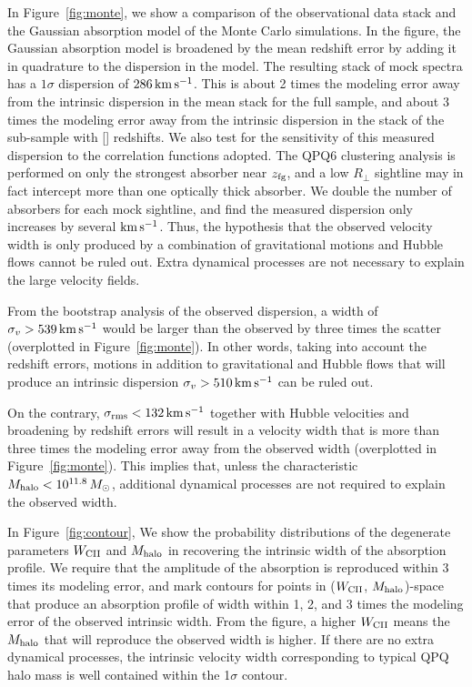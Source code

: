 \documentclass[iop]{emulateapj}
\begin{document}
In Figure~\ref{fig:monte}, we show a comparison of the observational data stack and the Gaussian 
absorption model of the Monte Carlo simulations. In the figure, the Gaussian absorption model is 
broadened by the mean redshift error by adding it in quadrature to the dispersion in the model. 
The resulting stack of mock spectra has a $1\sigma$ dispersion of $286\,{\rm km\,s^{-1}}$. This is
about 2 times the modeling error away from the intrinsic dispersion in the  mean stack 
for the full sample, and about 3 times the modeling error away from the intrinsic dispersion in 
the stack of the sub-sample with [] redshifts. We also test for the 
sensitivity of this measured dispersion to the correlation functions adopted. The QPQ6 clustering 
analysis is performed on only the strongest absorber near $z_{\rm fg}$, and a low $R_\perp$ 
sightline may in fact intercept more than one optically thick absorber. We double the number of 
absorbers for each mock sightline, and find the measured dispersion only increases by several 
${\rm km\,s^{-1}}$. Thus, the hypothesis that the observed velocity width is only produced by a 
combination of gravitational motions and Hubble flows cannot be ruled out. Extra dynamical 
processes are not necessary to explain the large velocity fields. 

From the bootstrap 
analysis of the observed dispersion, a width of $\sigma_v>539\,{\rm km\,s^{-1}}$ would be larger 
than the observed by three times the scatter (overplotted in Figure~\ref{fig:monte}). In other 
words, taking into account the redshift errors, motions in addition to gravitational and Hubble 
flows that will produce an intrinsic dispersion $\sigma_v>510\,{\rm km\,s^{-1}}$ can be ruled out. 

On the contrary, 
$\sigma_{\rm rms}<132\,{\rm km\,s^{-1}}$ together with Hubble velocities and
broadening by redshift errors will result in a velocity width that is more than three times the 
modeling error away from the observed width (overplotted in Figure~\ref{fig:monte}). This implies 
that, unless the characteristic $M_{\rm halo}<10^{11.8}\,M_\odot$,
additional dynamical processes are not required to explain the observed width.  

In Figure~\ref{fig:contour}, We show the probability distributions of the degenerate parameters 
$W_{\rm CII}$ and $M_{\rm halo}$ in recovering the intrinsic width of the absorption profile. We 
require that the amplitude of the absorption is reproduced within 3 times its modeling error, and 
mark contours for points in ($W_{\rm CII}$, $M_{\rm halo}$)-space that produce an absorption 
profile of width within 1, 2, and 3 times the modeling error of the observed intrinsic width. 
From the figure, a higher $W_{\rm CII}$ means the $M_{\rm halo}$ that will reproduce the observed 
width is higher. If there are no extra dynamical processes, the intrinsic velocity width 
corresponding to typical QPQ halo mass is well contained within the 1$\sigma$ contour. 
\end{document}
